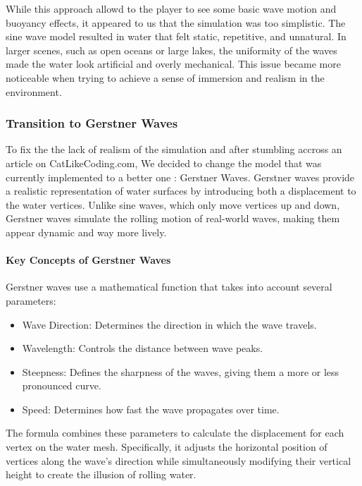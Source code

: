 \documentclass{article}
\begin{document}
While this approach allowd to the player to see some basic wave motion and buoyancy effects, it appeared to us that the simulation was too simplistic. The sine wave model resulted in water that felt static, repetitive, and unnatural. In larger scenes, such as open oceans or large lakes, the uniformity of the waves made the water look artificial and overly mechanical. This issue became more noticeable when trying to achieve a sense of immersion and realism in the environment.



\subsubsection{Transition to Gerstner Waves}\hfill

To fix the the lack of realism of the simulation and after stumbling accross an article on CatLikeCoding.com, We decided to change the model that was currently implemented to a better one : Gerstner Waves. Gerstner waves provide a realistic representation of water surfaces by introducing both a displacement to the water vertices. Unlike sine waves, which only move vertices up and down, Gerstner waves simulate the rolling motion of real-world waves, making them appear dynamic and way more lively.\\

\paragraph{Key Concepts of Gerstner Waves}\hfill

Gerstner waves use a mathematical function that takes into account several parameters:
\begin{itemize}
    \item Wave Direction: Determines the direction in which the wave travels.
    \item Wavelength: Controls the distance between wave peaks.
    \item Steepness: Defines the sharpness of the waves, giving them a more or less pronounced curve.
    \item Speed: Determines how fast the wave propagates over time.
\end{itemize}

The formula combines these parameters to calculate the displacement for each vertex on the water mesh. Specifically, it adjusts the horizontal position of vertices along the wave’s direction while simultaneously modifying their vertical height to create the illusion of rolling water.\\
\end{document}
